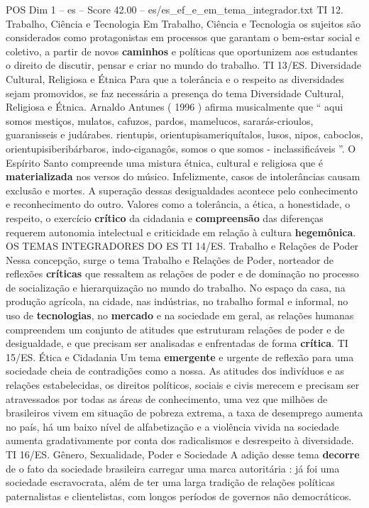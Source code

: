 \begin{textsample}{POS Dim 1 – es – Score 42.00 – es/es\_ef\_e\_em\_tema\_integrador.txt}
TI 12.
Trabalho, Ciência e Tecnologia Em Trabalho, Ciência e Tecnologia os sujeitos são considerados como protagonistas em processos que garantam o bem-estar social e coletivo, a partir de novos \textbf{caminhos} e políticas que oportunizem aos estudantes o direito de discutir, pensar e criar no mundo do trabalho.
TI 13/ES.
Diversidade Cultural, Religiosa e Étnica Para que a tolerância e o respeito as diversidades sejam promovidos, se faz necessária a presença do tema Diversidade Cultural, Religiosa e Étnica.
Arnaldo Antunes ( 1996 ) afirma musicalmente que “ aqui somos mestiços, mulatos, cafuzos, pardos, mamelucos, sararás-crioulos, guaranisseis e judárabes. rientupis, orientupisameriquítalos, lusos, nipos, caboclos, orientupisiberibárbaros, indo-ciganagôs, somos o que somos - inclassificáveis ”.
O Espírito Santo compreende uma mistura étnica, cultural e religiosa que é \textbf{materializada} nos versos do músico.
Infelizmente, casos de intolerâncias causam exclusão e mortes.
A superação dessas desigualdades acontece pelo conhecimento e reconhecimento do outro.
Valores como a tolerância, a ética, a honestidade, o respeito, o exercício \textbf{crítico} da cidadania e \textbf{compreensão} das diferenças requerem autonomia intelectual e criticidade em relação à cultura \textbf{hegemônica}.
OS TEMAS INTEGRADORES DO ES TI 14/ES.
Trabalho e Relações de Poder Nessa concepção, surge o tema Trabalho e Relações de Poder, norteador de reflexões \textbf{críticas} que ressaltem as relações de poder e de dominação no processo de socialização e hierarquização no mundo do trabalho.
No espaço da casa, na produção agrícola, na cidade, nas indústrias, no trabalho formal e informal, no uso de \textbf{tecnologias}, no \textbf{mercado} e na sociedade em geral, as relações humanas compreendem um conjunto de atitudes que estruturam relações de poder e de desigualdade, e que precisam ser analisadas e enfrentadas de forma \textbf{crítica}.
TI 15/ES.
Ética e Cidadania Um tema \textbf{emergente} e urgente de reflexão para uma sociedade cheia de contradições como a nossa.
As atitudes dos indivíduos e as relações estabelecidas, os direitos políticos, sociais e civis merecem e precisam ser atravessados por todas as áreas de conhecimento, uma vez que milhões de brasileiros vivem em situação de pobreza extrema, a taxa de desemprego aumenta no país, há um baixo nível de alfabetização e a violência vivida na sociedade aumenta gradativamente por conta dos radicalismos e desrespeito à diversidade.
TI 16/ES.
Gênero, Sexualidade, Poder e Sociedade A adição desse tema \textbf{decorre} de o fato da sociedade brasileira carregar uma marca autoritária : já foi uma sociedade escravocrata, além de ter uma larga tradição de relações políticas paternalistas e clientelistas, com longos períodos de governos não democráticos.

\end{textsample}
